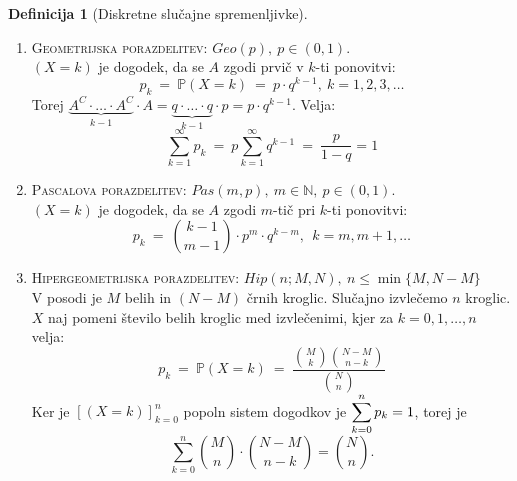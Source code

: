 \documentclass[11pt]{article}
\theoremstyle{definition}
\newtheorem{definicija}{Definicija}[section]
\theoremstyle{definition}
\theoremstyle{definition}
\begin{document}
\begin{definicija}[Diskretne slučajne spremenljivke]
\begin{enumerate}
	\item \textsc{Geometrijska porazdelitev}: $Geo(p), ~p \in (0, 1)$.\\
	$(X = k)$ je dogodek, da se $A$ zgodi prvič v $k$-ti ponovitvi:
	$$p_k ~=~ \mathbb{P}(X = k) ~=~ p \cdot q^{k-1}, ~k = 1, 2, 3, \ldots$$
	Torej $\underbrace{A^C \cdot \ldots \cdot A^C}_{k-1} \cdot A = \underbrace{q \cdot \ldots \cdot q}_{k-1} \cdot p = p \cdot q^{k-1}.$ Velja:
	$$\sum_{k=1}^{\infty} p_k ~=~ p \sum_{k=1}^{\infty} q^{k-1} ~=~ \frac{p}{1-q} = 1$$
	
	\item \textsc{Pascalova porazdelitev}: $Pas(m, p), ~m \in \mathbb{N}, ~p \in (0, 1).$\\
	$(X = k)$ je dogodek, da se $A$ zgodi $m$-tič pri $k$-ti ponovitvi:
	$$p_k ~=~ \binom{k-1}{m-1} \cdot p^m \cdot q^{k-m}, ~~k = m, m+1, \ldots$$
	
	\item \textsc{Hipergeometrijska porazdelitev}: $Hip(n; M, N), ~n \leq \min{\{M, N-M\}}$\\
	V posodi je $M$ belih in $(N-M)$ črnih kroglic. Slučajno izvlečemo $n$ kroglic. $X$ naj pomeni število belih kroglic med izvlečenimi, kjer za $k = 0, 1, \ldots, n$ velja:
	$$p_k ~=~ \mathbb{P}(X = k) ~=~ \frac{\binom{M}{k} \binom{N-M}{n-k}}{\binom{N}{n}}$$
	Ker je $\left[(X = k)\right]_{k=0}^n$ popoln sistem dogodkov je $\mathlarger{\sum_{k=0}^n p_k = 1}$, torej je
	$$\sum_{k=0}^n \binom{M}{n} \cdot \binom{N-M}{n-k} = \binom{N}{n}.$$
\end{enumerate}

\end{definicija}
\vspace{0.5cm}
\end{document}
